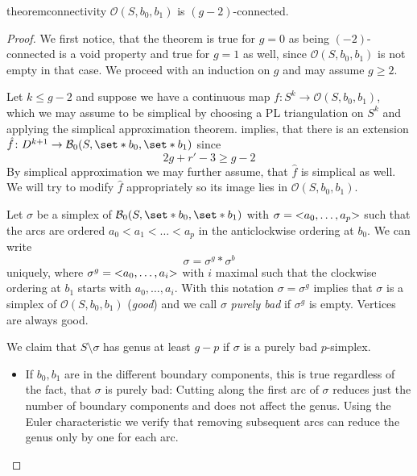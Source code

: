 \begin{restatable}[{name=[Connectivity]}]{theorem}{connectivity}\label{connec_main}
	$\mathcal{O}(S,b_0,b_1)$ is $(g-2)$-connected.
\end{restatable}

\begin{proof}
	We first notice, that the theorem is true for $g=0$ as being $(-2)$-connected is a void property and true for $g=1$ as well, since $\mathcal{O}(S,b_0,b_1)$ is not empty in that case.
	We proceed with an induction on $g$ and may assume $g\ge 2$.
	
	Let $k \le g-2$ and suppose we have a continuous map $f \colon S^k \to \mathcal{O}(S,b_0,b_1)$, which we may assume to be simplical by choosing a PL triangulation on $S^k$ and applying the simplical approximation theorem.
	 implies, that there is an extension $\hat{f} \colon D^{k+1} \to \mathcal{B}_0(S,\set*{b_0},\set*{b_1})$ since 
	\[
		2g + r' -3 \ge g-2
	\]
	By simplical approximation we may further assume, that $\hat{f}$ is simplical as well.
	We will try to modify $\hat{f}$ appropriately so its image lies in $\mathcal{O}(S,b_0,b_1)$.
	
	Let $\sigma$ be a simplex of $\mathcal{B}_0(S,\set*{b_0},\set*{b_1})$ with $\sigma = \lenbrace{a_0, \ldots , a_p}$ such that the arcs are ordered $a_0 < a_1 < \ldots < a_p$ in the anticlockwise ordering at $b_0$.
	We can write 
	\[
		\sigma = \sigma^g * \sigma^b
	\]
	uniquely, where $\sigma^g = \lenbrace{a_0, \ldots ,a_i}$ with $i$ maximal such that the clockwise ordering at $b_1$ starts with $a_0, \ldots , a_i$.
	With this notation $\sigma = \sigma^g$ implies that $\sigma$ is a simplex of $\mathcal{O}(S,b_0,b_1)$ (\emph{good}) and we call $\sigma$ \emph{purely bad} if $\sigma^g$ is empty.
	Vertices are always good.
	
	We claim that $S\setminus \sigma$ has genus at least $g-p$ if $\sigma$ is a purely bad $p$-simplex.
	\begin{itemize}[itemsep=0pt]
		\item If $b_0,b_1$ are in the different boundary components, this is true regardless of the fact, that $\sigma$ is purely bad:
		Cutting along the first arc of $\sigma$ reduces just the number of boundary components and does not affect the genus.
		Using the Euler characteristic we verify that removing subsequent arcs can reduce the genus only by one for each arc. 
		

\end{itemize}
\end{proof}

